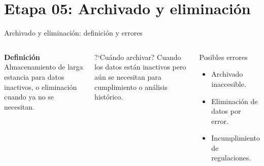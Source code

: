 \documentclass[aspectratio=169]{beamer}
\begin{document}
\section{Etapa 05: Archivado y eliminaci\'on}

\begin{frame}{Archivado y eliminaci\'on: definici\'on y errores}
  \begin{columns}[t]
      \textbf{Definici\'on}\\[2pt]
      Almacenamiento de larga estancia para datos inactivos, o eliminaci\'on
      cuando ya no se necesitan.
      \vspace{0.4em}
      \begin{block}{?`Cu\'ando archivar?}
        Cuando los datos est\'an inactivos pero a\'un se necesitan para
        cumplimiento o an\'alisis hist\'orico.
      \end{block}
      \begin{block}{Posibles errores}
        \begin{itemize}
          \item Archivado inaccesible.
          \item Eliminaci\'on de datos por error.
          \item Incumplimiento de regulaciones.
        \end{itemize}
      \end{block}
  \end{columns}
\end{frame}
\end{document}
